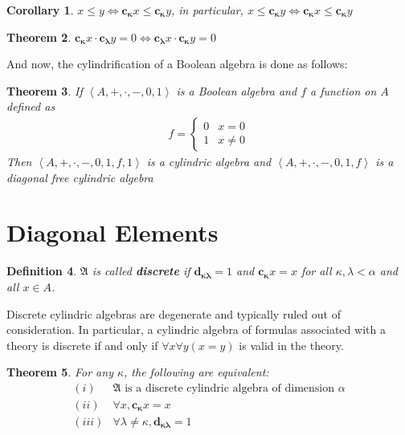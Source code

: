 \documentclass[12pt,a4paper]{article}
\newtheorem{theorem}{Theorem}[section]
\newtheorem{corollary}[theorem]{Corollary}
\newtheorem{definition}[theorem]{Definition}
\begin{document}
\begin{corollary}
$x\le y \iff \mathbf{c_\kappa}x\le\mathbf{c_\kappa}y$, in particular, $x\le\mathbf{c_\kappa}y\iff\mathbf{c_\kappa}x\le\mathbf{c_\kappa}y$
\end{corollary}

\begin{theorem}
$\mathbf{c_\kappa}x\cdot\mathbf{c_\lambda}y=0\iff\mathbf{c_\lambda}x\cdot\mathbf{c_\kappa}y=0$
\end{theorem}

And now, the cylindrification of a Boolean algebra is done as follows:

\begin{theorem}
If $\left<A,+,\cdot,-,0,1\right>$ is a Boolean algebra and $f$ a function on $A$ defined as
\begin{align*}f=\begin{cases}
0 & x=0\\
1 & x\neq 0
\end{cases}\end{align*}
Then $\left<A,+,\cdot,-,0,1,f,1\right>$ is a cylindric algebra and $\left<A,+,\cdot,-,0,1,f\right>$ is a diagonal free cylindric algebra
\end{theorem}

\section{Diagonal Elements}

\begin{definition}
$\mathfrak{A}$ is called \textbf{discrete} if $\mathbf{d_{\kappa\lambda}}=1$ and $\mathbf{c_\kappa}x=x$ for all $\kappa,\lambda<\alpha$ and all $x\in A$.
\end{definition}
Discrete cylindric algebras are degenerate and typically ruled out of consideration.
In particular, a cylindric algebra of formulas associated with a theory is discrete if and only if $\forall x\forall y (x=y)$ is valid in the theory.

\begin{theorem}
For any $\kappa$, the following are equivalent:
\begin{align*}
    (i)& \mathfrak{A} \text{  is a discrete cylindric algebra of dimension  }\alpha\\
    (ii)& \forall x, \mathbf{c_\kappa}x=x\\
    (iii)& \forall \lambda\neq \kappa, \mathbf{d_{\kappa\lambda}}=1
\end{align*}
\end{theorem}
\end{document}

